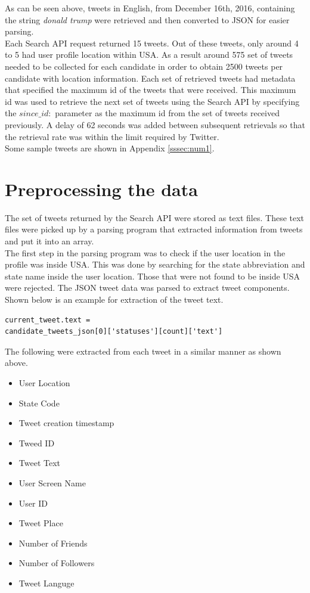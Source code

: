 \documentclass{sig-alternate-05-2015}
\begin{document}
As can be seen above, tweets in English, from December 16th, 2016, containing the string \textit{donald trump} were retrieved and then converted to JSON for easier parsing.\\

Each Search API request returned 15 tweets. Out of these tweets, only around 4 to 5 had user profile location within USA. As a result around 575 set of tweets needed to be collected for each candidate in order to obtain 2500 tweets per candidate with location information. Each set of retrieved tweets had metadata that specified the maximum id of the tweets that were received. This maximum id was used to retrieve the next set of tweets using the Search API by specifying the $since\_id:$ parameter as the maximum id from the set of tweets received previously. A delay of 62 seconds was added between subsequent retrievals so that the retrieval rate was within the limit required by Twitter.\\

Some sample tweets are shown in Appendix \ref{sssec:num1}.

\section{Preprocessing the data}

The set of tweets returned by the Search API were stored as text files. These text files were picked up by a parsing program that extracted information from tweets and put it into an array.\\

The first step in the parsing program was to check if the user location in the profile was inside USA. This was done by searching for the state abbreviation and state name inside the user location. Those that were not found to be inside USA were rejected. The JSON tweet data was parsed to extract tweet components. Shown below is an example for extraction of the tweet text.  

\begin{lstlisting}
current_tweet.text = 
candidate_tweets_json[0]['statuses'][count]['text']
\end{lstlisting}

The following were extracted from each tweet in a similar manner as shown above.

\begin{itemize}
\item User Location
\item State Code 
\item Tweet creation timestamp
\item Tweed ID
\item Tweet Text
\item User Screen Name
\item User ID
\item Tweet Place
\item Number of Friends
\item Number of Followers
\item Tweet Languge
\end{itemize}
\end{document}
